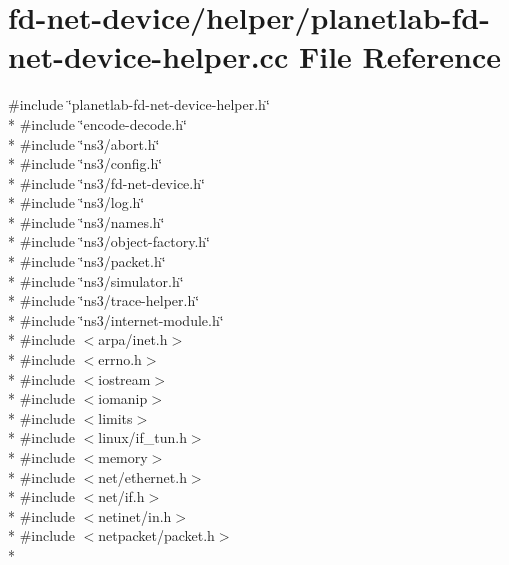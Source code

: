 \hypertarget{planetlab-fd-net-device-helper_8cc}{}\section{fd-\/net-\/device/helper/planetlab-\/fd-\/net-\/device-\/helper.cc File Reference}
\label{planetlab-fd-net-device-helper_8cc}
{\ttfamily \#include \char`\"{}planetlab-\/fd-\/net-\/device-\/helper.\+h\char`\"{}}\\*
{\ttfamily \#include \char`\"{}encode-\/decode.\+h\char`\"{}}\\*
{\ttfamily \#include \char`\"{}ns3/abort.\+h\char`\"{}}\\*
{\ttfamily \#include \char`\"{}ns3/config.\+h\char`\"{}}\\*
{\ttfamily \#include \char`\"{}ns3/fd-\/net-\/device.\+h\char`\"{}}\\*
{\ttfamily \#include \char`\"{}ns3/log.\+h\char`\"{}}\\*
{\ttfamily \#include \char`\"{}ns3/names.\+h\char`\"{}}\\*
{\ttfamily \#include \char`\"{}ns3/object-\/factory.\+h\char`\"{}}\\*
{\ttfamily \#include \char`\"{}ns3/packet.\+h\char`\"{}}\\*
{\ttfamily \#include \char`\"{}ns3/simulator.\+h\char`\"{}}\\*
{\ttfamily \#include \char`\"{}ns3/trace-\/helper.\+h\char`\"{}}\\*
{\ttfamily \#include \char`\"{}ns3/internet-\/module.\+h\char`\"{}}\\*
{\ttfamily \#include $<$arpa/inet.\+h$>$}\\*
{\ttfamily \#include $<$errno.\+h$>$}\\*
{\ttfamily \#include $<$iostream$>$}\\*
{\ttfamily \#include $<$iomanip$>$}\\*
{\ttfamily \#include $<$limits$>$}\\*
{\ttfamily \#include $<$linux/if\+\_\+tun.\+h$>$}\\*
{\ttfamily \#include $<$memory$>$}\\*
{\ttfamily \#include $<$net/ethernet.\+h$>$}\\*
{\ttfamily \#include $<$net/if.\+h$>$}\\*
{\ttfamily \#include $<$netinet/in.\+h$>$}\\*
{\ttfamily \#include $<$netpacket/packet.\+h$>$}\\*
